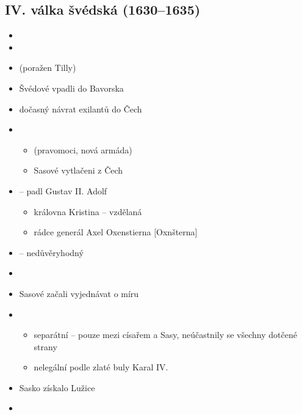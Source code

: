 \subsection{IV. válka švédská (1630--1635)}
\begin{itemize}
\item {}
\item {}
\item {} (poražen Tilly)
\item Švédové vpadli do Bavorska
\item {} \ra dočasný návrat exilantů do Čech
\item {}
	\begin{itemize}
	\item {} (pravomoci, nová armáda)
	\item Sasové vytlačeni z Čech
	\end{itemize}
\item {} -- padl Gustav II. Adolf
	\begin{itemize}
	\item královna Kristina -- vzdělaná 
	\item rádce generál Axel Oxenstierna [Oxnšterna]
	\end{itemize}
\item {} -- nedůvěryhodný
\item {}
\item Sasové začali vyjednávat o míru
\item {}
	\begin{itemize}
	\item separátní -- pouze mezi císařem a Sasy, neúčastnily se všechny dotčené strany
	\item nelegální podle zlaté buly Karal IV.
	\end{itemize}
\item Sasko získalo Lužice
\item {}
\end{itemize}

